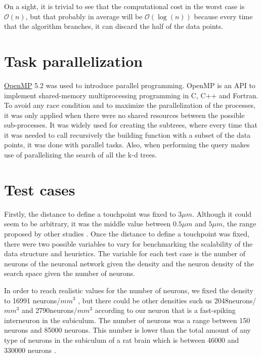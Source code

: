 On a sight, it is trivial to see that the computational cost in the worst case is $\mathcal{O}(n)$, but that probably in average will be $\mathcal{O}(\log{}(n))$ because every time that the algorithm branches, it can discard the half of the data points.
\pagebreak

\section{Task parallelization}
\href{https://www.openmp.org/}{OpenMP} 5.2 was used to introduce parallel programming. OpenMP is an API to implement shared-memory multiprocessing programming in C, C++ and Fortran. To avoid any race condition and to maximize the parallelization of the processes, it was only applied when there were no shared resources between the possible sub-processes. It was widely used for creating the subtrees, where every time that it was needed to call recursively the building function with a subset of the data points, it was done with parallel tasks. Also, when performing the query makes use of parallelizing the search of all the k-d trees.

\section{Test cases
    \label{methods:tests}}
Firstly, the distance to define a touchpoint was fixed to $3 \mu m$. Although it could seem to be arbitrary, it was the middle value between $0.5 \mu m$ and $5 \mu m$, the range proposed by other studies \cite{10.3389/fncom.2015.00120, doi:10.1073/pnas.1202128109}. Once the distance to define a touchpoint was fixed, there were two possible variables to vary for benchmarking the scalability of the data structure and heuristics. The variable for each test case is the number of neurons of the neuronal network given the density and the neuron density of the search space given the number of neurons.

In order to reach realistic values for the number of neurons, we fixed the density to 16991 neurons/$mm^3$ \cite{Trujillo-Estrada2014-uv}, but there could be other densities such us 2048neurons/$mm^3$ and 2790neurons/$mm^3$ \cite{Keller2018-dm} according to our neuron that is a fast-spiking interneuron in the subiculum. The number of neurons was a range between 150 neurons and 85000 neurons. This number is lower than the total amount of any type of neurons in the subiculum of a rat brain which is between 46000 and 330000 neurons \cite{Mulders1997-bh}.


